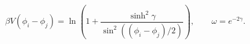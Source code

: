 \begin{equation}
\beta
V(\phi_i-\phi_j)=
\ln\left(1+\frac{\sinh^2\gamma}{\sin^2((\phi_i-\phi_j)/2)}\right),
\qquad \omega=e^{-2\gamma}.
\label{gas1}
\end{equation}

